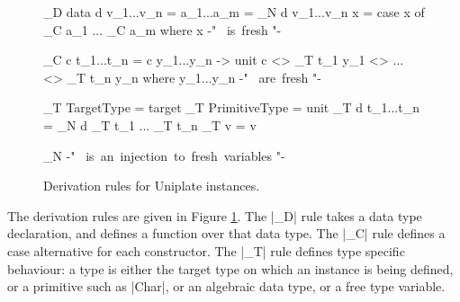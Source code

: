 \begin{figure}
\ignore\begin{code}
_D \< data d v_1...v_n = a_1...a_m \> =
        _N \< d \> \? v_1...v_n x = case  x of _C \< a_1 \> \? ... \? _C \< a_m \>
    where x {-" \mbox{ is fresh} "-}

_C \< c t_1...t_n \> =
        c y_1...y_n -> unit c <> _T \< t_1 \> \? y_1 <> ... <> _T \< t_n \> \? y_n
    where y_1...y_n {-" \mbox{ are fresh} "-}

_T \< TargetType     \> = target
_T \< PrimitiveType  \> = unit
_T \< d t_1...t_n    \> = _N \< d \> \? _T \< t_1 \> \? ... \? _T \< t_n \>
_T \< v              \> = v

_N {-" \mbox{ is an injection to fresh variables} "-}
\end{code}
\caption{Derivation rules for Uniplate instances.}
\label{fig:derive}
\end{figure}

The derivation rules are given in Figure \ref{fig:derive}. The |_D| rule takes a data type declaration, and defines a function over that data type. The |_C| rule defines a case alternative for each constructor. The |_T| rule defines type specific behaviour: a type is either the target type on which an instance is being defined, or a primitive such as |Char|, or an algebraic data type, or a free type variable.

\begin{comment}

To model the derivation of an instance, it is necessary to have a model of data types:

\begin{code}
data Data  = Data  Name [Var] [Ctor]
data Ctor  = Ctor  Name [Type]
data Type  = TyPrim | TyVar Var | TyApp Data [Type]

type Name  = String
type Var   = String
\end{code}

\begin{code}
isTarget :: a -> Bool
\end{code}

When writing a |Uniplate| instance for a particular data type, |isTarget| returns True for that data type. We define how to produce a function for a given |Data| type using the |_D| function:

\begin{code}


unwords $
    ['d':name] ++ vars ++ ["x ="] ++
    ["case x of {"] ++
        separate ";" (map _C ctors) ++
    ["}"]

_C (Ctor name typs) =
    [name] ++ vars ++ [" -> "] ++
    ["unit"] ++ [name] ++ ["<>"] ++
    separate "<>" (zipWith (:) vars (map _T typs))
    where vars = ['v':show i | i <- [1..length typs]]

_T (TyPrim                       ) = ["unit"]
_T (TyVar  v                     ) = [v]
_T (TyApp  d@(Data name _ _) ts  )
    | isTarget d  = ["target"]
    | otherwise   = ['d':name] ++ concatMap _T ts

separate sep xs = concat $ intersperse [sep] xs
\end{code}

\end{comment}

